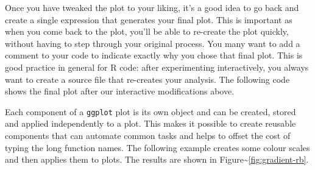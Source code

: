 Once you have tweaked the plot to your liking, it's a good idea to go
back and create a single expression that generates your final plot. This
is important as when you come back to the plot, you'll be able to
re-create the plot quickly, without having to step through your original
process. You many want to add a comment to your code to indicate exactly
why you chose that final plot. This is good practice in general for R
code: after experimenting interactively, you always want to create a
source file that re-creates your analysis. The following code shows the
final plot after our interactive modifications above.

\begin{Shaded}
\begin{Highlighting}[]
  \StringTok{ }
\StringTok{  }\NormalTok{(} \NormalTok{) +}
\StringTok{  }\NormalTok{(}\NormalTok{, }\NormalTok{) +}\StringTok{ }\NormalTok{(}\NormalTok{, }\NormalTok{)}
\end{Highlighting}
\end{Shaded}


Each component of a \texttt{ggplot} plot is its own object and can be
created, stored and applied independently to a plot. This makes it
possible to create reusable components that can automate common tasks
and helps to offset the cost of typing the long function names. The
following example creates some colour scales and then applies them to
plots. The results are shown in
Figure\textasciitilde{}\ref{fig:gradient-rb}. 

\begin{Shaded}
\begin{Highlighting}[]
\StringTok{ }\NormalTok{(} \NormalTok{, } \NormalTok{)}
  \StringTok{ }
\end{Highlighting}
\end{Shaded}

